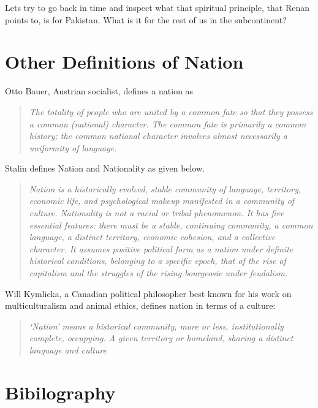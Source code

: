 \documentclass[
]{book}
\begin{document}
Lets try to go back in time and inspect what that spiritual principle, that Renan points to, is for Pakistan. What is it for the rest of us in the subcontinent?

\hypertarget{other-definitions-of-nation}{%
\section{Other Definitions of Nation}\label{other-definitions-of-nation}}

Otto Bauer, Austrian socialist, defines a nation as

\begin{quote}
\emph{The totality of people who are united by a common fate so that they possess a common (national) character. The common fate is primarily a common history; the common national character involves almost necessarily a uniformity of language.}
\end{quote}

Stalin defines Nation and Nationality as given below.

\begin{quote}
\emph{Nation is a historically evolved, stable community of language, territory, economic life, and psychological makeup manifested in a community of culture. Nationality is not a racial or tribal phenomenon. It has five essential features: there must be a stable, continuing community, a common language, a distinct territory, economic cohesion, and a collective character. It assumes positive political form as a nation under definite historical conditions, belonging to a specific epoch, that of the rise of capitalism and the struggles of the rising bourgeosie under feudalism.}
\end{quote}

Will Kymlicka, a Canadian political philosopher best known for his work on multiculturalism and animal ethics, defines nation in terms of a culture:

\begin{quote}
\emph{`Nation' means a historical community, more or less, institutionally complete, occupying. A given territory or homeland, sharing a distinct language and culture}
\end{quote}

\hypertarget{bibilography}{%
\section{Bibilography}\label{bibilography}}
\end{document}
